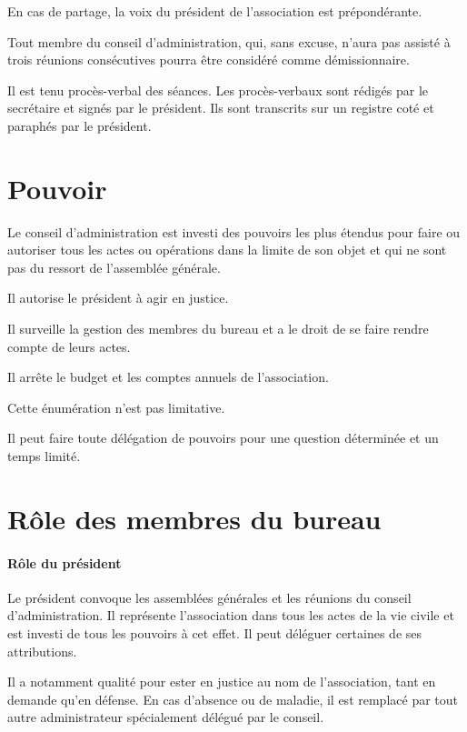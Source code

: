 \documentclass[12 pt]{article}
\begin{document}
En cas de partage, la voix du président de l'association est
prépondérante.

Tout membre du conseil d'administration, qui, sans excuse, n'aura pas
assisté à trois réunions consécutives pourra être considéré comme
démissionnaire.

Il est tenu procès-verbal des séances. Les procès-verbaux sont rédigés
par le secrétaire et signés par le président. Ils sont transcrits sur
un registre coté et paraphés par le président.

\section{Pouvoir}
\label{sec:pouvoir}

Le conseil d'administration est investi des pouvoirs les plus étendus
pour faire ou autoriser tous les actes ou opérations dans la limite de
son objet et qui ne sont pas du ressort de l'assemblée générale.

Il autorise le président à agir en justice.

Il surveille la gestion des membres du bureau et a le droit de se
faire rendre compte de leurs actes.

Il arrête le budget et les comptes annuels de l'association.

Cette énumération n'est pas limitative.

Il peut faire toute délégation de pouvoirs pour une question
déterminée et un temps limité.

\section{Rôle des membres du bureau}
\label{sec:role-des-membres-du-bureau}

\paragraph{Rôle du président}

Le président convoque les assemblées générales et les réunions du
conseil d'administration. Il représente l'association dans tous les
actes de la vie civile et est investi de tous les pouvoirs à cet
effet. Il peut déléguer certaines de ses attributions.

Il a notamment qualité pour ester en justice au nom de l'association,
tant en demande qu'en défense. En cas d'absence ou de maladie, il est
remplacé par tout autre administrateur spécialement délégué par le
conseil.
\end{document}

